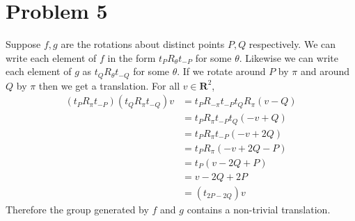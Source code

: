 \documentclass{article}
\begin{document}
\section*{Problem 5}
Suppose $f,g$ are the rotations about distinct points $P,Q$ respectively.
We can write each element of $f$ in the form $t_P R_\theta t_{-P}$ for some $\theta$.
Likewise we can write each element of $g$ as $t_Q R_\theta t_{-Q}$ for some $\theta$.
If we rotate around $P$ by $\pi$ and around $Q$ by $\pi$ then we get a translation.
For all $v \in \mathbf{R}^2$,
\begin{align*}
	(t_P R_{\pi} t_{-P})(t_Q R_\pi t_{-Q})v &= t_P R_{-\pi} t_{-P}t_Q R_\pi (v-Q) \\
	&= t_P R_{\pi} t_{-P}t_Q  (-v+Q) \\
	&= t_P R_{\pi} t_{-P}  (-v+2Q) \\
	&= t_P R_{\pi}  (-v+2Q-P) \\
	&= t_P  (v-2Q+P) \\
	&= v-2Q+2P \\
	&= (t_{2P-2Q})v
\end{align*}
Therefore the group generated by $f$ and $g$ contains 
a non-trivial translation.

\newpage
\end{document}
